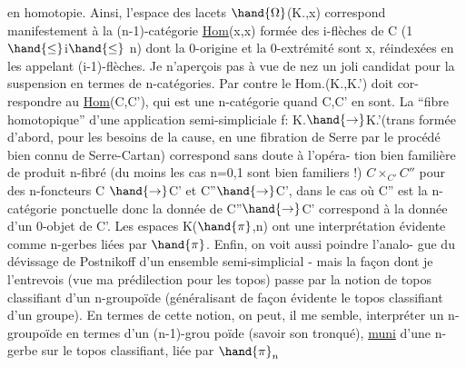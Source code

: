 
en homotopie. Ainsi, l'espace des lacets $\hand{\Omega}$(K.,x) correspond manifestement
à la (n-1)-catégorie \uline{Hom}(x,x) formée des i-flèches de C (1 $\hand{\leq}$i$\hand{\leq}$ n)
dont la 0-origine et la 0-extrémité sont x, réindexées en les appelant
(i-1)-flèches. Je  n'aperçois pas à vue de nez un joli candidat pour la
suspension en termes de n-catégories. Par contre le Hom.(K.,K.') doit cor-%
respondre au \uline{Hom}(C,C'), qui est une n-catégorie quand C,C' en sont. La
``fibre homotopique'' d'une application semi-simpliciale f: K.$\hand{\to}$K.'(trans
formée d'abord, pour les besoins de la cause, en une fibration de Serre
par le procédé bien connu de Serre-Cartan) correspond sans doute à l'opéra-%
tion bien familière de produit \hand{(}n-fibré (du moins les cas n=0,1 sont bien
familiers !)  $C\times_{C'}C''$ pour des n-foncteurs C $\hand{\to}$C' et C''$\hand{\to}$C', dans le cas
où C'' est la n-catégorie ponctuelle\hand{,} donc la donnée de C''$\hand{\to}$C' correspond à
la donnée d'un 0-objet de C'. Les espaces K($\hand{\pi}$,n) ont une interprétation
évidente comme n-gerbes liées par $\hand{\pi}$. Enfin, on voit aussi poindre l'analo-%
gue du dévissage de Postnikoff d'un ensemble semi-simplicial - mais la
façon dont je l'entrevois (vue ma prédilection pour les topos) passe par
la notion de topos classifiant d'un n-groupoïde (généralisant de façon
évidente le topos classifiant d'un groupe). En termes de cette notion,
on peut, il me semble, interpréter un n-groupoïde en termes d'un (n-1)-grou
poïde (savoir son tronqué), \uline{muni} d'une n-gerbe sur le topos classifiant,
liée par $\hand{\pi}_n$ 

